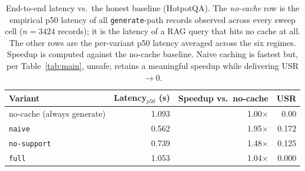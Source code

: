 \begin{table}[t]
\centering\small
\caption{End-to-end latency vs.\ the honest baseline (HotpotQA). The \emph{no-cache} row is the empirical p50 latency of all \texttt{generate}-path records observed across every sweep cell ($n=3424$ records); it is the latency of a RAG query that hits no cache at all. The other rows are the per-variant p50 latency averaged across the six regimes. Speedup is computed against the no-cache baseline. Naive caching is fastest but, per Table~\ref{tab:main}, unsafe; \sys{} retains a meaningful speedup while delivering USR$\to$0.}
\label{tab:latency_vs_nocache}
\begin{tabular}{l rrr}
\toprule
Variant & Latency$_{p50}$ (s) & Speedup vs.\ no-cache & USR \\
\midrule
no-cache (always generate) & 1.093 & 1.00$\times$ & 0.00 \\
\texttt{naive} & 0.562 & 1.95$\times$ & 0.172 \\
\texttt{no-support} & 0.739 & 1.48$\times$ & 0.125 \\
\texttt{full} & 1.053 & 1.04$\times$ & 0.000 \\
\bottomrule
\end{tabular}
\end{table}
